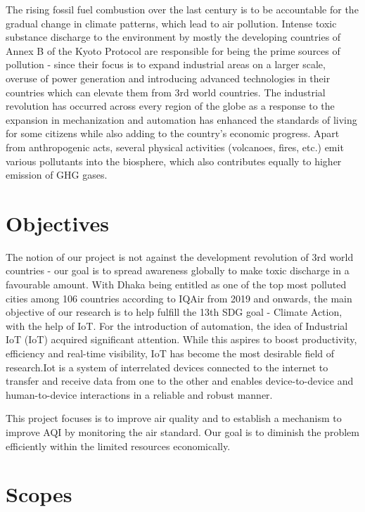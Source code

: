 The rising fossil fuel combustion over the last century is to be accountable for the gradual change in climate patterns, which lead to air pollution. Intense toxic substance discharge to the environment by mostly the developing countries of Annex B of the Kyoto Protocol are responsible for being the prime sources of pollution - since their focus is to expand industrial areas on a larger scale, overuse of power generation and introducing advanced technologies in their countries which can elevate them from 3rd world countries. The industrial revolution has occurred across every region of the globe as a response to the expansion in mechanization and automation has enhanced the standards of living for some citizens while also adding to the country's economic progress.  Apart from anthropogenic acts, several physical activities (volcanoes, fires, etc.) emit various pollutants into the biosphere, which also contributes equally to higher emission of GHG gases. 

\section{Objectives}

The notion of our project is not against the development revolution of 3rd world countries - our goal is to spread awareness globally to make toxic discharge in a favourable amount. With Dhaka being entitled as one of the top most polluted cities among 106 countries according to IQAir from 2019 and onwards, the main objective of our research is to help fulfill the 13th SDG goal - Climate Action,  with the help of IoT. For the introduction of automation, the idea of Industrial IoT (IoT) acquired significant attention. While this aspires to boost productivity, efficiency and real-time visibility, IoT has become the most desirable field of research.Iot is a system of interrelated devices connected to the internet to transfer and receive data from one to the other and enables device-to-device and human-to-device interactions in a reliable and robust manner. 

This project focuses is to improve air quality and to establish a mechanism to improve AQI by monitoring the air standard. Our goal is to diminish the problem efficiently within the limited resources economically.


\section{Scopes}

